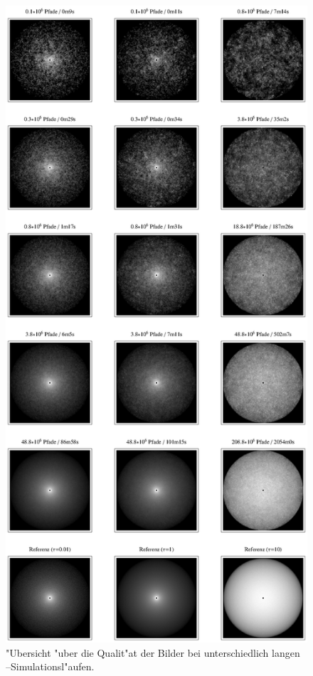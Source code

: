 		\begin{figure}
			\centering
			\includegraphics[height=1.0\textheight]{piratesphereimageoverview.eps}
			\caption{"Ubersicht "uber die Qualit"at der Bilder bei unterschiedlich langen \pirate--Simulationsl"aufen.}
			\label{fig:pirate_sphere_imageoverview}
		\end{figure}
	
